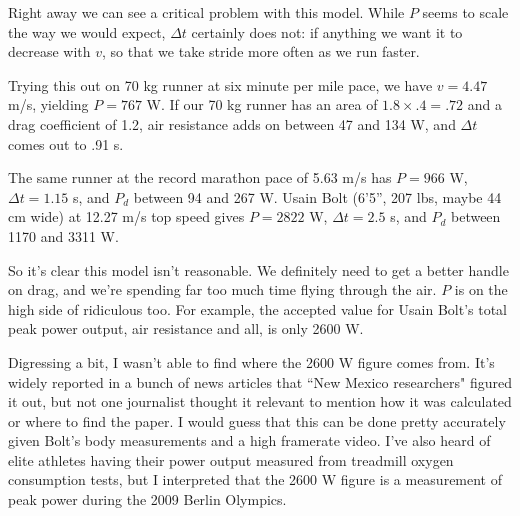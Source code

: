 \documentclass[12pt]{article}
\begin{document}
Right away we can see a critical problem with this model. While \(P\) seems to scale the way we would expect, \(\Delta t\) certainly does not: if anything we want it to decrease with \(v\), so that we take stride more often as we run faster. 

Trying this out on 70 kg runner at six minute per mile pace, we have \(v = 4.47\) m/s, yielding \(P = 767\) W. If our 70 kg runner has an area of \(1.8 \times .4 = .72\) \msq and a drag coefficient of 1.2, air resistance adds on between 47 and 134 W, and \(\Delta t\) comes out to .91 s.

The same runner at the record marathon pace of 5.63 m/s has \(P = 966\) W, \(\Delta t = 1.15\) s, and \(P_d\) between 94 and 267 W. Usain Bolt (6'5'', 207 lbs, maybe 44 cm wide) at 12.27 m/s top speed gives \(P = 2822\) W, \(\Delta t = 2.5\) s, and \(P_d\) between 1170 and 3311 W.

So it's clear this model isn't reasonable. We definitely need to get a better handle on drag, and we're spending far too much time flying through the air. \(P\) is on the high side of ridiculous too. For example, the accepted value for Usain Bolt's total peak power output, air resistance and all, is only 2600 W.

Digressing a bit, I wasn't able to find where the 2600 W figure comes from. It's widely reported in a bunch of news articles that ``New Mexico researchers" figured it out, but not one journalist thought it relevant to mention how it was calculated or where to find the paper. I would guess that this can be done pretty accurately given Bolt's body measurements and a high framerate video. I've also heard of elite athletes having their power output measured from treadmill oxygen consumption tests, but I interpreted that the 2600 W figure is a measurement of peak power during the 2009 Berlin Olympics.
\end{document}
